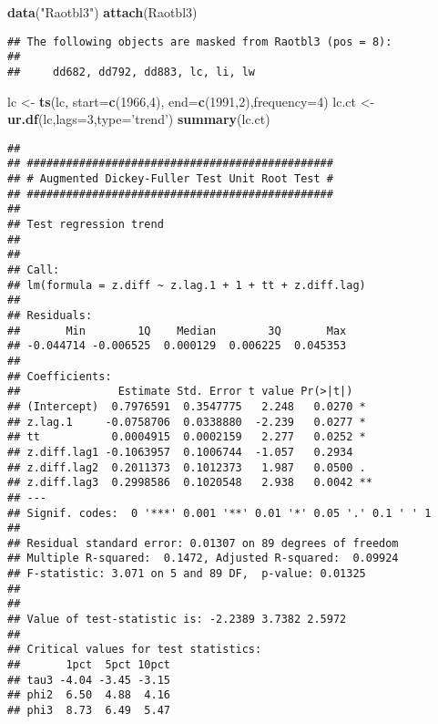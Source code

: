 \documentclass[]{book}
\newenvironment{Shaded}{\begin{snugshade}}{\end{snugshade}}
\newcommand{\KeywordTok}[1]{\textcolor[rgb]{0.13,0.29,0.53}{\textbf{#1}}}
\newcommand{\DataTypeTok}[1]{\textcolor[rgb]{0.13,0.29,0.53}{#1}}
\newcommand{\DecValTok}[1]{\textcolor[rgb]{0.00,0.00,0.81}{#1}}
\newcommand{\StringTok}[1]{\textcolor[rgb]{0.31,0.60,0.02}{#1}}
\newcommand{\NormalTok}[1]{#1}
\theoremstyle{definition}
\theoremstyle{definition}
\theoremstyle{definition}
\theoremstyle{remark}
\begin{document}
\begin{Shaded}
\begin{Highlighting}[]
\KeywordTok{data}\NormalTok{(}\StringTok{"Raotbl3"}\NormalTok{)}
\KeywordTok{attach}\NormalTok{(Raotbl3)}
\end{Highlighting}
\end{Shaded}

\begin{verbatim}
## The following objects are masked from Raotbl3 (pos = 8):
## 
##     dd682, dd792, dd883, lc, li, lw
\end{verbatim}

\begin{Shaded}
\begin{Highlighting}[]
\NormalTok{lc <-}\StringTok{ }\KeywordTok{ts}\NormalTok{(lc, }\DataTypeTok{start=}\KeywordTok{c}\NormalTok{(}\DecValTok{1966}\NormalTok{,}\DecValTok{4}\NormalTok{), }\DataTypeTok{end=}\KeywordTok{c}\NormalTok{(}\DecValTok{1991}\NormalTok{,}\DecValTok{2}\NormalTok{),}\DataTypeTok{frequency=}\DecValTok{4}\NormalTok{)}
\NormalTok{lc.ct <-}\StringTok{ }\KeywordTok{ur.df}\NormalTok{(lc,}\DataTypeTok{lags=}\DecValTok{3}\NormalTok{,}\DataTypeTok{type=}\StringTok{'trend'}\NormalTok{)}
\KeywordTok{summary}\NormalTok{(lc.ct)}
\end{Highlighting}
\end{Shaded}

\begin{verbatim}
## 
## ############################################### 
## # Augmented Dickey-Fuller Test Unit Root Test # 
## ############################################### 
## 
## Test regression trend 
## 
## 
## Call:
## lm(formula = z.diff ~ z.lag.1 + 1 + tt + z.diff.lag)
## 
## Residuals:
##       Min        1Q    Median        3Q       Max 
## -0.044714 -0.006525  0.000129  0.006225  0.045353 
## 
## Coefficients:
##               Estimate Std. Error t value Pr(>|t|)   
## (Intercept)  0.7976591  0.3547775   2.248   0.0270 * 
## z.lag.1     -0.0758706  0.0338880  -2.239   0.0277 * 
## tt           0.0004915  0.0002159   2.277   0.0252 * 
## z.diff.lag1 -0.1063957  0.1006744  -1.057   0.2934   
## z.diff.lag2  0.2011373  0.1012373   1.987   0.0500 . 
## z.diff.lag3  0.2998586  0.1020548   2.938   0.0042 **
## ---
## Signif. codes:  0 '***' 0.001 '**' 0.01 '*' 0.05 '.' 0.1 ' ' 1
## 
## Residual standard error: 0.01307 on 89 degrees of freedom
## Multiple R-squared:  0.1472, Adjusted R-squared:  0.09924 
## F-statistic: 3.071 on 5 and 89 DF,  p-value: 0.01325
## 
## 
## Value of test-statistic is: -2.2389 3.7382 2.5972 
## 
## Critical values for test statistics: 
##       1pct  5pct 10pct
## tau3 -4.04 -3.45 -3.15
## phi2  6.50  4.88  4.16
## phi3  8.73  6.49  5.47
\end{verbatim}
\end{document}
